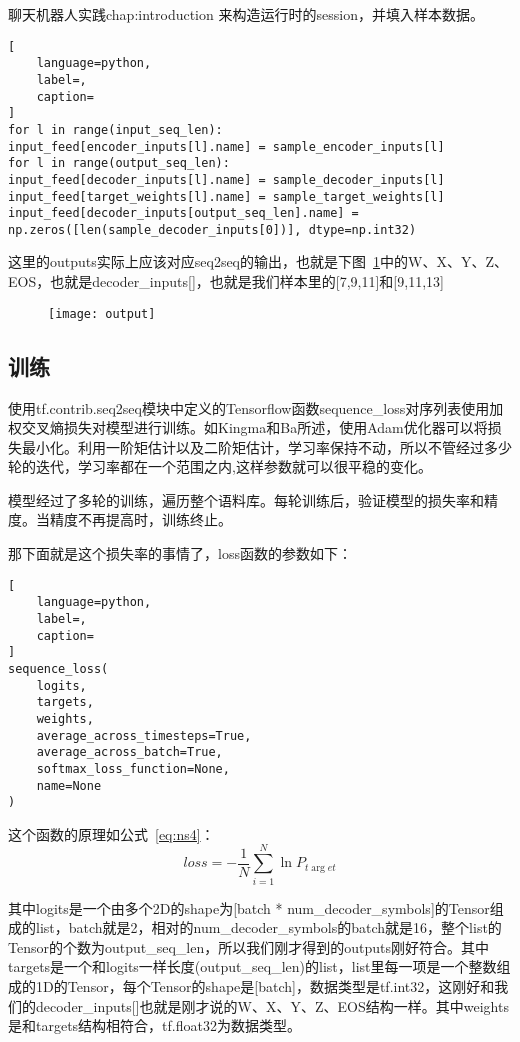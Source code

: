 \begin{cuzchapter}{聊天机器人实践}{chap:introduction}
来构造运行时的session，并填入样本数据。
\begin{lstlisting}[
    language=python,
    label=,
    caption=
]
for l in range(input_seq_len):
input_feed[encoder_inputs[l].name] = sample_encoder_inputs[l]
for l in range(output_seq_len):
input_feed[decoder_inputs[l].name] = sample_decoder_inputs[l]
input_feed[target_weights[l].name] = sample_target_weights[l]
input_feed[decoder_inputs[output_seq_len].name] = np.zeros([len(sample_decoder_inputs[0])], dtype=np.int32)
\end{lstlisting}

这里的outputs实际上应该对应seq2seq的输出，也就是下图~\ref{output}中的W、X、Y、Z、EOS，也就是decoder\_inputs[]，也就是我们样本里的[7,9,11]和[9,11,13]
\begin{figure}[!htbp]
    \centering
    \texttt{[image: output]}
    \caption[output]{}
    \label{output}
\end{figure}
\subsection{训练}\label{sec:background}
使用tf.contrib.seq2seq模块中定义的Tensorflow函数sequence\_loss对序列表使用加权交叉熵损失对模型进行训练。如Kingma和Ba\cite{DBLP:journals/corr/Adam}所述，使用Adam优化器可以将损失最小化。利用一阶矩估计以及二阶矩估计，学习率保持不动，所以不管经过多少轮的迭代，学习率都在一个范围之内,这样参数就可以很平稳的变化。

模型经过了多轮的训练，遍历整个语料库。每轮训练后，验证模型的损失率和精度。当精度不再提高时，训练终止。

那下面就是这个损失率的事情了，loss函数的参数如下：
\begin{lstlisting}[
    language=python,
    label=,
    caption=
]
sequence_loss(
    logits,
    targets,
    weights,
    average_across_timesteps=True,
    average_across_batch=True,
    softmax_loss_function=None,
    name=None
)
\end{lstlisting}

这个函数的原理如公式~\ref{eq:ns4}：
\begin{equation}
    \label{eq:ns4}
    loss=-\dfrac {1}{N}\sum ^{N}_{i=1}\ln P_{t\arg et}  
\end{equation}

其中logits是一个由多个2D的shape为[batch * num\_decoder\_symbols]的Tensor组成的list，batch就是2，相对的num\_decoder\_symbols的batch就是16，整个list的Tensor的个数为output\_seq\_len，所以我们刚才得到的outputs刚好符合。其中targets是一个和logits一样长度(output\_seq\_len)的list，list里每一项是一个整数组成的1D的Tensor，每个Tensor的shape是[batch]，数据类型是tf.int32，这刚好和我们的decoder\_inputs[]也就是刚才说的W、X、Y、Z、EOS结构一样。其中weights是和targets结构相符合，tf.float32为数据类型。


\end{cuzchapter}
